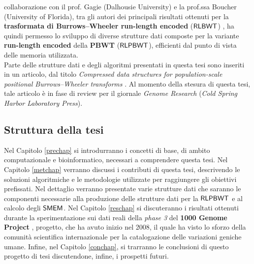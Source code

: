 \documentclass[a4paper,12pt, oneside]{book}
\newcommand{\dc}[1]{\todo[backgroundcolor=yellow]{\textbf{DC} #1}}
\def\RLBWT{\mbox{\rm {\sf RLBWT}}}
\def\RLPBWT{\mbox{\rm {\sf RLPBWT}}}
\def\SMEM{\mbox{\rm {\sf SMEM}}}
\begin{document}
collaborazione con il 
prof. Gagie (Dalhousie University) e la prof.ssa Boucher 
(University of Florida), tra gli autori dei principali risultati ottenuti per la
\textbf{trasformata di Burrows--Wheeler run-length encoded} ($\RLBWT$)
\cite{rlbwt} 
\cite{gagie2020} \cite{moni} \cite{phoni}, ha quindi permesso lo sviluppo di
diverse strutture dati composte per la variante 
\textbf{run-length encoded} della \textbf{PBWT} ($\RLPBWT$),
efficienti dal punto di vista delle memoria utilizzata.\\
Parte delle strutture dati e degli algoritmi presentati in questa tesi sono
inseriti in un articolo, dal titolo \textit{Compressed data structures for
  population-scale positional Burrows--Wheeler transforms} \cite{rlpbwt}. Al
momento della 
stesura di questa tesi, tale articolo è in fase di review per il giornale
\textit{Genome Research} (\textit{Cold Spring Harbor Laboratory Press}).
\subsection*{Struttura della tesi}
Nel Capitolo \ref{prechap} si introdurranno i concetti di base, di ambito
computazionale e bioinformatico, necessari a
comprendere questa tesi. Nel Capitolo \ref{metchap} verranno discussi i
contributi di questa tesi, descrivendo le soluzioni algoritmiche e le
metodologie utilizzate per raggiungere gli obiettivi prefissati. Nel dettaglio
verranno presentate varie strutture dati che saranno le componenti necessarie
alla produzione delle strutture dati per la $\RLPBWT$ e al calcolo degli
$\SMEM$. Nel Capitolo 
\ref{reschap} si discuteranno i risultati ottenuti durante la
sperimentazione sui dati reali della \textit{phase 3} del \textbf{1000 Genome
  Project} \cite{1kgp}, progetto, che ha avuto inizio nel 2008, il quale ha
visto lo sforzo 
della comunità scientifica internazionale per la catalogazione delle variazioni
geniche umane. Infine, nel Capitolo \ref{conchap}, si trarranno le conclusioni 
di questo progetto di tesi discutendone, infine, i prospetti futuri.
\dc{L'intera introduzione va estesa}
\end{document}
